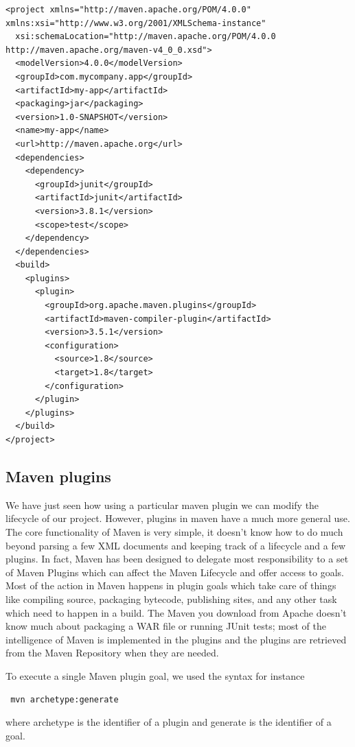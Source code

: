 \documentclass{article}
\begin{document}
\begin{lstlisting}
<project xmlns="http://maven.apache.org/POM/4.0.0" xmlns:xsi="http://www.w3.org/2001/XMLSchema-instance"
  xsi:schemaLocation="http://maven.apache.org/POM/4.0.0 http://maven.apache.org/maven-v4_0_0.xsd">
  <modelVersion>4.0.0</modelVersion>
  <groupId>com.mycompany.app</groupId>
  <artifactId>my-app</artifactId>
  <packaging>jar</packaging>
  <version>1.0-SNAPSHOT</version>
  <name>my-app</name>
  <url>http://maven.apache.org</url>
  <dependencies>
    <dependency>
      <groupId>junit</groupId>
      <artifactId>junit</artifactId>
      <version>3.8.1</version>
      <scope>test</scope>
    </dependency>
  </dependencies>
  <build>
    <plugins>
      <plugin>
        <groupId>org.apache.maven.plugins</groupId>
        <artifactId>maven-compiler-plugin</artifactId>
        <version>3.5.1</version>
        <configuration>
          <source>1.8</source>
          <target>1.8</target>
        </configuration>
      </plugin>
    </plugins>
  </build>
</project>
\end{lstlisting}



\subsection{Maven plugins}

We have just seen how using a particular maven plugin we can modify
the lifecycle of our project. However, plugins in maven have a much
more general use. 
The core functionality of Maven is very simple, it doesn’t know how to
do much beyond parsing a few XML documents and keeping track of a
lifecycle and a few plugins. In fact, Maven has been designed to
delegate most responsibility to a set of Maven Plugins which can
affect the Maven Lifecycle and offer access to goals. Most of the
action in Maven happens in plugin goals which take care of things like
compiling source, packaging bytecode, publishing sites, and any other
task which need to happen in a build. The Maven you download from
Apache doesn’t know much about packaging a WAR file or running JUnit
tests; most of the intelligence of Maven is implemented in the plugins
and the plugins are retrieved from the Maven Repository when they are
needed.

To execute a single Maven plugin goal, we used the syntax for instance
\begin{lstlisting}
 mvn archetype:generate
\end{lstlisting}
where archetype is the identifier of a plugin and
generate is the identifier of a goal.
\end{document}
